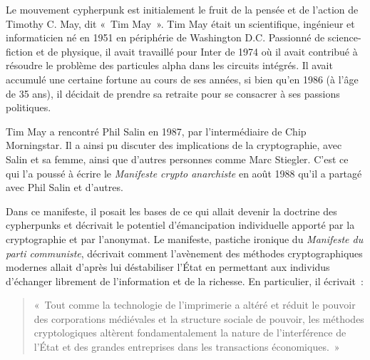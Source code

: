 Le mouvement cypherpunk est initialement le fruit de la pensée et de l'action de Timothy C. May, dit «~Tim May~». Tim May était un scientifique, ingénieur et informaticien né en 1951 en périphérie de Washington D.C. Passionné de science-fiction et de physique, il avait travaillé pour Inter de 1974 où il avait contribué à résoudre le problème des particules alpha dans les circuits intégrés. Il avait accumulé une certaine fortune au cours de ses années, si bien qu'en 1986 (à l'âge de 35 ans), il décidait de prendre sa retraite pour se consacrer à ses passions politiques.

Tim May a rencontré Phil Salin en 1987, par l'intermédiaire de Chip Morningstar. Il a ainsi pu discuter des implications de la cryptographie, avec Salin et sa femme, ainsi que d'autres personnes comme Marc Stiegler. C'est ce qui l'a poussé à écrire le \emph{Manifeste crypto anarchiste} en août 1988 qu'il a partagé avec Phil Salin et d'autres.

Dans ce manifeste, il posait les bases de ce qui allait devenir la doctrine des cypherpunks et décrivait le potentiel d'émancipation individuelle apporté par la cryptographie et par l'anonymat. Le manifeste, pastiche ironique du \emph{Manifeste du parti communiste}, décrivait comment l'avènement des méthodes cryptographiques modernes allait d'après lui déstabiliser l'État en permettant aux individus d'échanger librement de l'information et de la richesse. En particulier, il écrivait~:

\begin{quote}
«~Tout comme la technologie de l'imprimerie a altéré et réduit le pouvoir des corporations médiévales et la structure sociale de pouvoir, les méthodes cryptologiques altèrent fondamentalement la nature de l'interférence de l'État et des grandes entreprises dans les transactions économiques.~»
\end{quote} %

